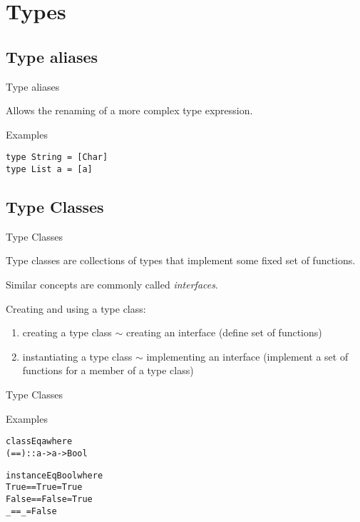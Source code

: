 \documentclass{beamer}
\begin{document}
\section{Types}

\subsection{Type aliases}

\begin{frame}[fragile]{Type aliases}

Allows the renaming of a more complex type expression.

\pause

\begin{exampleblock}{Examples}
\begin{verbatim}
type String = [Char]
type List a = [a]
\end{verbatim}
\end{exampleblock}

\end{frame}

\subsection{Type Classes}

\begin{frame}{Type Classes}

\begin{block}{\centering Type classes are collections of types that implement some fixed set of functions.}
\end{block}

\pause

Similar concepts are commonly called \textit{interfaces}.

\pause

\vspace{1cm}
Creating and using a type class:\pause
\begin{enumerate}
    \item creating a type class $\sim$ creating an interface (define set of functions)\pause
    \item instantiating a type class $\sim$ implementing an interface (implement a set of functions for a member of a type class)
\end{enumerate}

\end{frame}

\begin{frame}[fragile]{Type Classes}

\begin{exampleblock}{Examples}
\begin{alltt}
class Eq a where\pause
  (==) :: a -> a -> Bool\pause

instance Eq Bool where\pause
  True  == True  = True\pause
  False == False = True\pause
  _     == _     = False
\end{alltt}
\end{exampleblock}

\end{frame}
\end{document}
